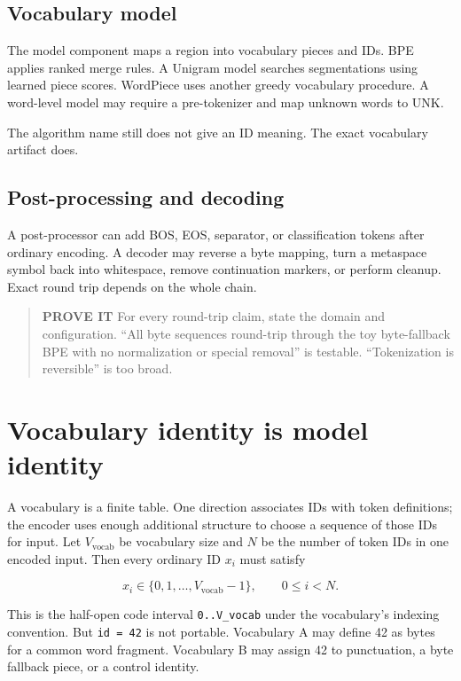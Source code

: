 \subsection{Vocabulary model}\label{vocabulary-model}

The model component maps a region into vocabulary pieces and IDs. BPE
applies ranked merge rules. A Unigram model searches segmentations using
learned piece scores. WordPiece uses another greedy vocabulary
procedure. A word-level model may require a pre-tokenizer and map
unknown words to UNK.

The algorithm name still does not give an ID meaning. The exact
vocabulary artifact does.

\subsection{Post-processing and
decoding}\label{post-processing-and-decoding}

A post-processor can add BOS, EOS, separator, or classification tokens
after ordinary encoding. A decoder may reverse a byte mapping, turn a
metaspace symbol back into whitespace, remove continuation markers, or
perform cleanup. Exact round trip depends on the whole chain.

\begin{quote}
\textbf{PROVE IT} For every round-trip claim, state the domain and
configuration. ``All byte sequences round-trip through the toy
byte-fallback BPE with no normalization or special removal'' is
testable. ``Tokenization is reversible'' is too broad.
\end{quote}

\section{Vocabulary identity is model
identity}\label{vocabulary-identity-is-model-identity}

A vocabulary is a finite table. One direction associates IDs with token
definitions; the encoder uses enough additional structure to choose a
sequence of those IDs for input. Let \(V_{\mathrm{vocab}}\) be
vocabulary size and \(N\) be the number of token IDs in one encoded
input. Then every ordinary ID \(x_i\) must satisfy

\begin{equation}
x_i\in\{0,1,\ldots,V_{\mathrm{vocab}}-1\},
\qquad 0\le i<N.
\end{equation}

This is the half-open code interval \texttt{0..V\_vocab} under the
vocabulary's indexing convention. But \texttt{id\ =\ 42} is not
portable. Vocabulary A may define 42 as bytes for a common word
fragment. Vocabulary B may assign 42 to punctuation, a byte fallback
piece, or a control identity.

